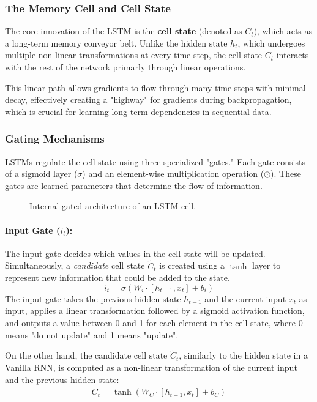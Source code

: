 \subsubsection{The Memory Cell and Cell State}
The core innovation of the LSTM is the \textbf{cell state} (denoted as $C_t$), which acts as a long-term memory conveyor belt. 
Unlike the hidden state $h_t$, which undergoes multiple non-linear transformations at every time step, the cell state $C_t$ 
interacts with the rest of the network primarly through linear operations.

This linear path allows gradients to flow through many time steps with minimal decay, 
effectively creating a "highway" for gradients during backpropagation, which is crucial for learning long-term dependencies in sequential data.

\subsubsection{Gating Mechanisms}
LSTMs regulate the cell state using three specialized "gates." 
Each gate consists of a sigmoid layer ($\sigma$) and an element-wise multiplication operation ($\odot$). 
These gates are learned parameters that determine the flow of information.

\begin{figure}[H]
    \centering
    \resizebox{.8\textwidth}{!}{
        
    }
    \caption{Internal gated architecture of an LSTM cell.}
\end{figure}

\paragraph{Input Gate ($i_t$):}
The input gate decides which values in the cell state will be updated. 
Simultaneously, a \textit{candidate} cell state $\tilde{C}_t$ is created using a $\tanh$ layer to represent new information that could be added to the state.
\begin{equation}
    i_t = \sigma\left(W_i \cdot [h_{t-1}, x_t] + b_i\right)
\end{equation}
The input gate takes the previous hidden state $h_{t-1}$ and the current input $x_t$ as input, applies a linear transformation followed by a sigmoid activation function,
and outputs a value between 0 and 1 for each element in the cell state, where 0 means "do not update" and 1 means "update".

On the other hand, the candidate cell state $\tilde{C}_t$, similarly to the hidden state in a Vanilla RNN, 
is computed as a non-linear transformation of the current input and the previous hidden state:
\begin{equation}
    \tilde{C}_t = \tanh\left(W_C \cdot [h_{t-1}, x_t] + b_C\right)
\end{equation}


